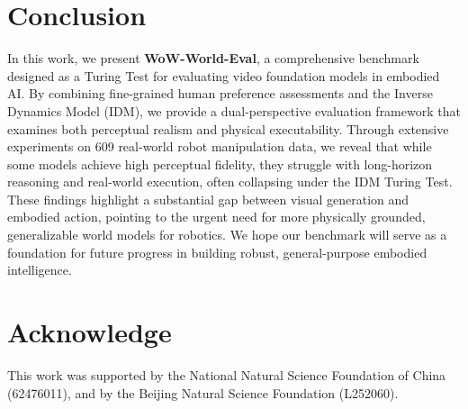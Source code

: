 \section{Conclusion}
In this work, we present \textbf{WoW-World-Eval}, a comprehensive benchmark designed as a Turing Test for evaluating video foundation models in embodied AI. By combining fine-grained human preference assessments and the Inverse Dynamics Model (IDM), we provide a dual-perspective evaluation framework that examines both perceptual realism and physical executability. Through extensive experiments on 609 real-world robot manipulation data, we reveal that while some models achieve high perceptual fidelity, they struggle with long-horizon reasoning and real-world execution, often collapsing under the IDM Turing Test. These findings highlight a substantial gap between visual generation and embodied action, pointing to the urgent need for more physically grounded, generalizable world models for robotics. We hope our benchmark will serve as a foundation for future progress in building robust, general-purpose embodied intelligence.

\section{Acknowledge}
This work was supported by the National Natural Science Foundation of China (62476011), and by the Beijing Natural Science Foundation (L252060).